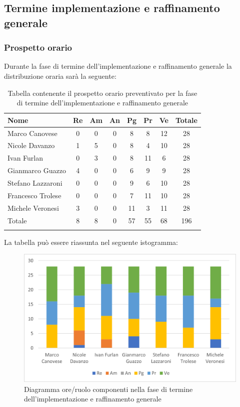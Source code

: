 			\subsection{Termine implementazione e raffinamento generale}
            \subsubsection{Prospetto orario}
			Durante la fase di termine dell'implementazione e raffinamento generale la distribuzione oraria sarà la seguente:
			
			\begin{longtable}{|l|c|c|c|c|c|c|c|}
				\hline
				\rowcolor{lighter-grayer}
				\textbf{Nome} & \textbf{Re} & \textbf{Am} & \textbf{An} & \textbf{Pg}  & \textbf{Pr}   & \textbf{Ve} & \textbf{Totale} \\
				\hline
				\endfirsthead
				
				\hline
				Marco Canovese & 0 & 0 & 0 & 8 & 8 & 12 & 28\\
				\hline
				\hline
				Nicole Davanzo & 1 & 5 & 0 & 8 & 4 & 10 & 28\\
				\hline
				\hline
				Ivan Furlan & 0 & 3 & 0 & 8 & 11 & 6 & 28\\
				\hline
				\hline
				Gianmarco Guazzo & 4 & 0 & 0 & 6 & 9 & 9 & 28\\
				\hline
				\hline
				Stefano Lazzaroni & 0 & 0 & 0 & 9 & 6 & 10 & 28\\
				\hline
				\hline
				Francesco Trolese & 0 & 0 & 0 & 7 & 11 & 10 & 28\\
				\hline
				\hline
				Michele Veronesi & 3 & 0 & 0 & 11 & 3 & 11 & 28\\
				\hline 
				\hline
				Totale & 8 & 8 & 0 & 57 & 55 & 68 & 196\\
				\hline
				\rowcolor{white}
				\caption{Tabella contenente il prospetto orario preventivato per la fase di termine dell'implementazione e raffinamento generale}
			\end{longtable}

		
			La tabella può essere riassunta nel seguente istogramma:
		
			\begin{figure}[H]
				\centering
				\includegraphics[width=0.8\linewidth]{res/images/preventivo/6-1.png}
				\caption{Diagramma ore/ruolo componenti nella fase di termine dell'implementazione e raffinamento generale}
				\label{fig:diagramma suddivisione ruoli fase termine dell'implementazione e raffinamento generale}
			\end{figure}
		

